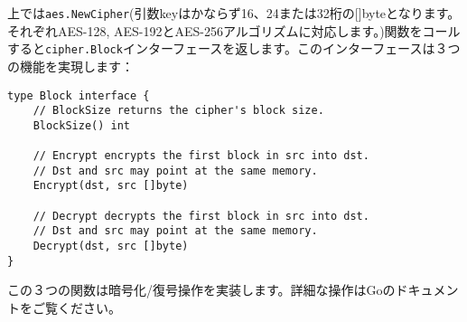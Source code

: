 上では\texttt{aes.NewCipher}(引数keyはかならず16、24または32桁の[]byteとなります。それぞれAES-128, AES-192とAES-256アルゴリズムに対応します。)関数をコールすると\texttt{cipher.Block}インターフェースを返します。このインターフェースは３つの機能を実現します：

\begin{lstlisting}[numbers=none]
type Block interface {
    // BlockSize returns the cipher's block size.
    BlockSize() int

    // Encrypt encrypts the first block in src into dst.
    // Dst and src may point at the same memory.
    Encrypt(dst, src []byte)

    // Decrypt decrypts the first block in src into dst.
    // Dst and src may point at the same memory.
    Decrypt(dst, src []byte)
}
\end{lstlisting}


この３つの関数は暗号化/復号操作を実装します。詳細な操作はGoのドキュメントをご覧ください。
